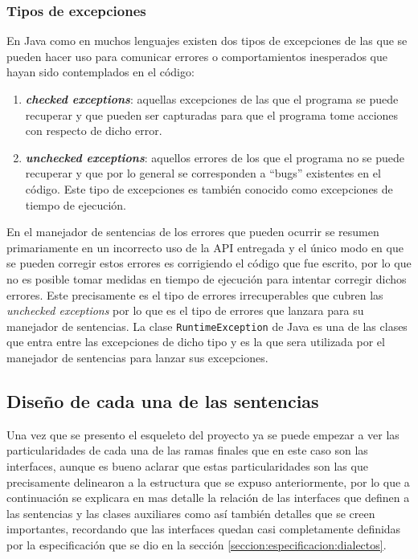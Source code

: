 \subsubsection{Tipos de excepciones}
En Java como en muchos lenguajes existen dos tipos de excepciones de las que se pueden hacer uso\citep{java:exeptions} para comunicar errores o comportamientos inesperados que hayan sido contemplados en el código:
\begin{enumerate}
\item \textbf{\textit{checked exceptions}}: aquellas excepciones de las que el programa se puede recuperar y que pueden ser capturadas para que el programa tome acciones con respecto de dicho error.
%
\item \textbf{\textit{unchecked exceptions}}: aquellos errores de los que el programa no se puede recuperar y que por lo general se corresponden a ``bugs'' existentes en el código. Este tipo de excepciones es también conocido como excepciones de tiempo de ejecución.
\end{enumerate}
%
En el manejador de sentencias de \jj los errores que pueden ocurrir se resumen primariamente en un incorrecto uso de la API entregada y el único modo en que se pueden corregir estos errores es corrigiendo el código que fue escrito, por lo que no es posible tomar medidas en tiempo de ejecución para intentar corregir dichos errores. Este precisamente es el tipo de errores irrecuperables que cubren las \textit{unchecked exceptions} por lo que es el tipo de errores que lanzara \jj para su manejador de sentencias. La clase \verb=RuntimeException= de Java es una de las clases que entra entre las excepciones de dicho tipo y es la que sera utilizada por el manejador de sentencias para lanzar sus excepciones.
%
\subsection{Diseño de cada una de las sentencias}
Una vez que se presento el esqueleto del proyecto ya se puede empezar a ver las particularidades de cada una de las ramas finales que en este caso son las interfaces, aunque es bueno aclarar que estas particularidades son las que precisamente delinearon a la estructura que se expuso anteriormente, por lo que a continuación se explicara en mas detalle la relación de las interfaces que definen a las sentencias y las clases auxiliares como así también detalles que se creen importantes, recordando que las interfaces quedan casi completamente definidas por la especificación que se dio en la sección \ref{seccion:especificacion:dialectos}.
%

